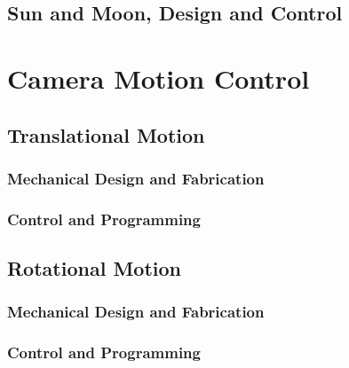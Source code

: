 \documentclass[]{report}
\begin{document}
	\chapter{Sun and Moon, Design and Control}

\part{Camera Motion Control}
	
	\chapter{Translational Motion}
		\section{Mechanical Design and Fabrication}
		\section{Control and Programming}
		
	\chapter{Rotational Motion}
		\section{Mechanical Design and Fabrication}
		\section{Control and Programming}
	
	
	
	
	
\end{document}
